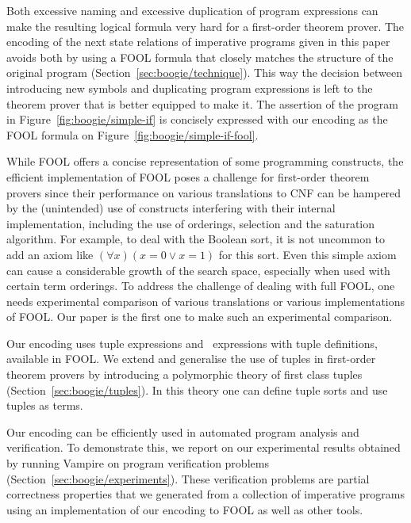 Both excessive naming and excessive duplication of program expressions can make the resulting logical formula very hard for a first-order theorem prover. The encoding of the next state relations of imperative programs given in this paper avoids both by using a FOOL formula that closely matches the structure of the original program (Section~\ref{sec:boogie/technique}). This way the decision between introducing new symbols and duplicating program expressions is left to the theorem prover that is better equipped to make it. The assertion of the program in Figure~\ref{fig:boogie/simple-if} is concisely expressed with our encoding as the FOOL formula on Figure~\ref{fig:boogie/simple-if-fool}.

While FOOL offers a concise representation of some programming constructs, the efficient implementation of FOOL poses a challenge for first-order theorem provers since their performance on various translations to CNF can be hampered by the (unintended) use of constructs interfering with their internal implementation, including the use of orderings, selection and the saturation algorithm. For example, to deal with the Boolean sort, it is not uncommon to add an axiom like $(\forall x)(x = 0 \vee x = 1)$ for this sort. Even this simple axiom can cause a considerable growth of the search space, especially when used with certain term orderings. To address the challenge of dealing with full FOOL, one needs experimental comparison of various translations or various implementations of FOOL. Our paper is the first one to make such an experimental comparison.

Our encoding uses tuple expressions and \LETIN\ expressions with tuple definitions, available in FOOL. We extend and generalise the use of tuples in first-order theorem provers by introducing a polymorphic theory of first class tuples (Section~\ref{sec:boogie/tuples}). In this theory one can define tuple sorts and use tuples as terms.

Our encoding can be efficiently used in automated program analysis and verification. To demonstrate this, we report on our experimental results obtained by running Vampire on program verification problems (Section~\ref{sec:boogie/experiments}). These verification problems are partial correctness properties that we generated from a collection of imperative programs using an implementation of our encoding to FOOL as well as other tools.

